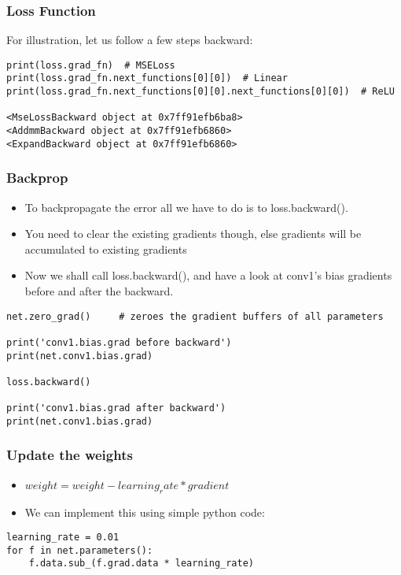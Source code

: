 \begin{frame}[fragile] \frametitle{Loss Function}
For illustration, let us follow a few steps backward:
\begin{lstlisting}
print(loss.grad_fn)  # MSELoss
print(loss.grad_fn.next_functions[0][0])  # Linear
print(loss.grad_fn.next_functions[0][0].next_functions[0][0])  # ReLU

<MseLossBackward object at 0x7ff91efb6ba8>
<AddmmBackward object at 0x7ff91efb6860>
<ExpandBackward object at 0x7ff91efb6860>
\end{lstlisting}

\end{frame}

\begin{frame}[fragile] \frametitle{Backprop}
\begin{itemize}
\item To backpropagate the error all we have to do is to loss.backward(). 
\item You need to clear the existing gradients though, else gradients will be accumulated to existing gradients
\item Now we shall call loss.backward(), and have a look at conv1's bias gradients before and after the backward.
\end{itemize}
\begin{lstlisting}
net.zero_grad()     # zeroes the gradient buffers of all parameters

print('conv1.bias.grad before backward')
print(net.conv1.bias.grad)

loss.backward()

print('conv1.bias.grad after backward')
print(net.conv1.bias.grad)
\end{lstlisting}

\end{frame}


\begin{frame}[fragile] \frametitle{Update the weights}
\begin{itemize}
\item $weight = weight - learning_rate * gradient$
\item We can implement this using simple python code:
\end{itemize}
\begin{lstlisting}
learning_rate = 0.01
for f in net.parameters():
    f.data.sub_(f.grad.data * learning_rate)
\end{lstlisting}

\end{frame}


